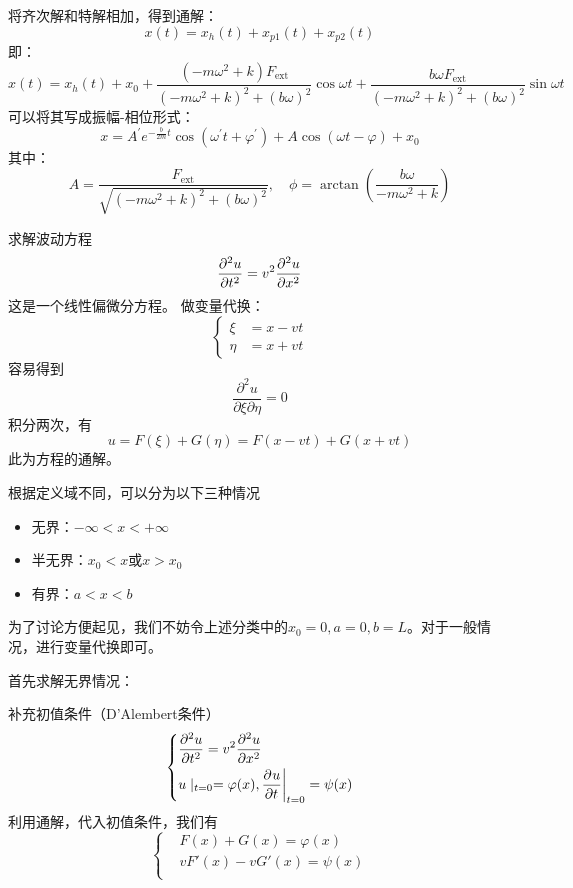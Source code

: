 \begin{prove}[求解受迫振动的微分方程]
    将齐次解和特解相加，得到通解：
    \[
        x(t) = x_h(t) + x_{p1}(t) + x_{p2}(t)
    \]
    即：
    \[
        x(t) = x_h(t) + x_0 + \frac{(-m\omega^2 + k) F_{\text{ext}}}{(-m\omega^2 + k)^2 + (b\omega)^2} \cos \omega t + \frac{b\omega F_{\text{ext}}}{(-m\omega^2 + k)^2 + (b\omega)^2} \sin \omega t
    \]
    可以将其写成振幅-相位形式：
    \[x=A^{\prime}e^{-\frac{b}{2m}t}\cos(\omega^{\prime}t+\varphi^{\prime})+A\cos(\omega t-\varphi)+x_0\]
    其中：
    \[
        A = \frac{F_{\text{ext}}}{\sqrt{(-m\omega^2 + k)^2 + (b\omega)^2}}, \quad \phi = \arctan\left(\frac{b\omega}{-m\omega^2 + k}\right)
    \]
\end{prove}

\begin{prove}[波动方程在不同边界条件下的求解]
    求解波动方程
    \[ \Par[2]{u}{t}=v^2\Par[2]{u}{x} \]
    这是一个线性偏微分方程。
    做变量代换：
    \[
        \left\{
        \begin{aligned}
            \xi  & =x-vt \\
            \eta & =x+vt
        \end{aligned}
        \right.
    \]
    容易得到
    \[\frac{\partial^2u}{\partial\xi\partial\eta}=0\]
    积分两次，有
    \[u=F(\xi)+G(\eta)=F(x-vt)+G(x+vt)\]
    此为方程的通解。\par
    根据定义域不同，可以分为以下三种情况
    \begin{itemize}
        \item 无界：$-\infty<x<+\infty$
        \item 半无界：$x_0<x$或$x>x_0$
        \item 有界：$a<x<b$
    \end{itemize}
    为了讨论方便起见，我们不妨令上述分类中的$x_0=0,a=0,b=L$。对于一般情况，进行变量代换即可。\par
    首先求解无界情况：\par
    补充初值条件（D'Alembert条件）
    \[
        \left\{
        \begin{aligned}
             & \Par[2]{u}{t}=v^2\Par[2]{u}{x}                          \\
             & u\mid_{t=0}=\varphi(x),\Par[]{u}{t}\bigg|_{t=0}=\psi(x)
        \end{aligned}
        \right.
    \]
    利用通解，代入初值条件，我们有
    \[
        \left\{
        \begin{aligned}
             & F(x)+G(x)=\varphi(x)  \\
             & vF'(x)-vG'(x)=\psi(x) \\

\end{aligned}\]
\end{prove}
